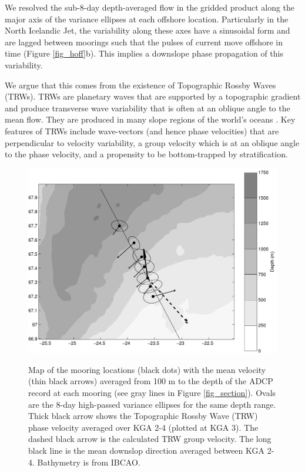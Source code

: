\documentclass[12pt,titlepage,figuresatend]{article}
\begin{document}
We resolved the sub-8-day depth-averaged flow in the gridded product along the major axis of the variance ellipses at each offshore location. Particularly in the North Icelandic Jet, the variability along these axes have a sinusoidal form and are lagged between moorings such that the pulses of current move offshore in time (Figure \ref{fig_hoff}b). This implies a downslope phase propagation of this variability.

We argue that this comes from the existence of Topographic Rossby Waves (TRWs). TRWs are planetary waves that are supported by a topographic gradient and produce transverse wave variability that is often at an oblique angle to the mean flow. They are produced in many slope regions of the world’s oceans \cite[]{Garrett1979,Louis1982,Pickart1990}. Key features of TRWs include wave-vectors (and hence phase velocities) that are perpendicular to velocity variability, a group velocity which is at an oblique angle to the phase velocity, and a propensity to be bottom-trapped by stratification.

\begin{figure}[ht!]
  \centering\includegraphics[width=\hsize]{./figures/map_ellipse.pdf}
  \caption{Map of the mooring locations (black dots) with the mean velocity (thin black arrows) averaged from 100 m to the depth of the ADCP record at each mooring (see gray lines in Figure \ref{fig_section}). Ovals are the 8-day high-passed variance ellipses for the same depth range. Thick black arrow shows the Topographic Rossby Wave (TRW) phase velocity averaged over KGA 2-4 (plotted at KGA 3). The dashed black arrow is the calculated TRW group velocity. The long black line is the mean downslop direction averaged between KGA 2-4. Bathymetry is from IBCAO.}{\label{fig_ellipse}}
\end{figure}
\end{document}
